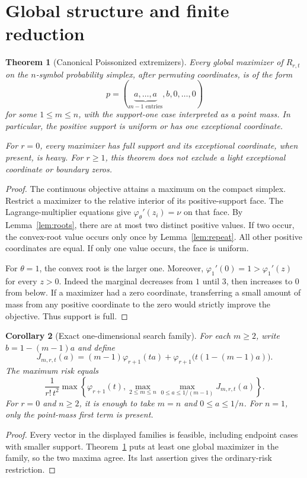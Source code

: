 \documentclass[11pt]{article}
\newtheorem{theorem}{Theorem}
\newtheorem{corollary}[theorem]{Corollary}
\theoremstyle{remark}\newtheorem{remark}[theorem]{Remark}
\begin{document}
\section{Global structure and finite reduction}
\begin{theorem}[Canonical Poissonized extremizers]\label{thm:main}
Every global maximizer of \(R_{r,t}\) on the \(n\)-symbol probability simplex, after permuting coordinates, is of the form
\[
p=(\underbrace{a,\ldots,a}_{m-1\text{ entries}},b,0,\ldots,0)
\]
for some \(1\le m\le n\), with the support-one case interpreted as a point mass. In particular, the positive support is uniform or has one exceptional coordinate.

For \(r=0\), every maximizer has full support and its exceptional coordinate, when present, is heavy. For \(r\ge1\), this theorem does not exclude a light exceptional coordinate or boundary zeros.
\end{theorem}
\begin{proof}
The continuous objective attains a maximum on the compact simplex. Restrict a maximizer to the relative interior of its positive-support face. The Lagrange-multiplier equations give
\(\varphi_\theta'(z_i)=\nu\) on that face.
By Lemma~\ref{lem:roots}, there are at most two distinct positive values. If two occur, the convex-root value occurs only once by Lemma~\ref{lem:repeat}. All other positive coordinates are equal. If only one value occurs, the face is uniform.

For \(\theta=1\), the convex root is the larger one. Moreover,
\(\varphi_1'(0)=1>\varphi_1'(z)\) for every \(z>0\).
Indeed the marginal decreases from \(1\) until \(3\), then increases to \(0\) from below. If a maximizer had a zero coordinate, transferring a small amount of mass from any positive coordinate to the zero would strictly improve the objective. Thus support is full.
\end{proof}

\begin{corollary}[Exact one-dimensional search family]
For each \(m\ge2\), write \(b=1-(m-1)a\) and define
\[
J_{m,r,t}(a)
=(m-1)\varphi_{r+1}(ta)
+\varphi_{r+1}\bigl(t(1-(m-1)a)\bigr).
\]
The maximum risk equals
\[
\frac1{r!\,t^2}
\max\left\{\varphi_{r+1}(t),
\max_{2\le m\le n}\max_{0\le a\le1/(m-1)}J_{m,r,t}(a)\right\}.
\]
For \(r=0\) and \(n\ge2\), it is enough to take \(m=n\) and \(0\le a\le1/n\). For \(n=1\), only the point-mass first term is present.
\end{corollary}
\begin{proof}
Every vector in the displayed families is feasible, including endpoint cases with smaller support. Theorem~\ref{thm:main} puts at least one global maximizer in the family, so the two maxima agree. Its last assertion gives the ordinary-risk restriction.
\end{proof}
\end{document}
